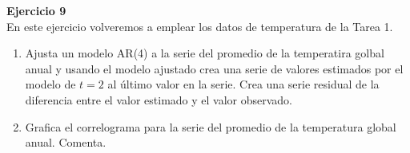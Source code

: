 \documentclass[a4paper, 11pt]{article}
\newenvironment{problem}[2][Ejercicio]
{ \begin{mdframed}[backgroundcolor= red!50] \textbf{#1 #2} \\}
	{  \end{mdframed}}
\begin{document}
\begin{problem}{9} 
    En este ejercicio volveremos a emplear los datos de temperatura de la Tarea 1. 
    \begin{enumerate}
        \item Ajusta un modelo AR(4) a la serie del promedio de la temperatira golbal anual y usando el modelo ajustado crea una serie de valores estimados por el modelo de $t = 2 $ al último valor en la serie. Crea una serie residual de la diferencia entre el valor estimado y el valor observado. 
        \item Grafica el correlograma para la serie del promedio de la temperatura global anual. Comenta.
    \end{enumerate}
\end{problem}
\end{document}
